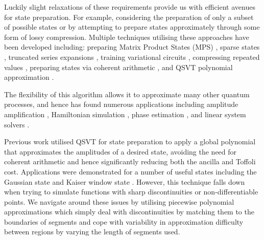 Luckily slight relaxations of these requirements provide us with efficient avenues for state preparation. For example, considering the preparation of only a subset of possible states or by attempting to prepare states approximately through some form of lossy compression. Multiple techniques utilising these approaches have been developed including: preparing Matrix Product States (MPS) \cite{Ran_2020, 9259933, Melnikov_2023, PhysRevA.101.010301, PhysRevResearch.4.043007, Iaconis:2023rna, PhysRevLett.132.040404}, sparse states \cite{Zhang2022}, truncated series expansions \cite{Welch_2014, Zylberman:2023knk, Moosa:2023ecz}, training variational circuits \cite{Zoufal_2019, Nakaji:2021dew, Marin-Sanchez:2021ast}, compressing repeated values \cite{Sunderhauf:2023xrz, PhysRevResearch.5.013200}, preparing states via coherent arithmetic \cite{Bhaskar:2015jjo, Haner:2018yea}, and QSVT polynomial approximation \cite{mcardleQuantumStatePreparation2022, Gonzalez-Conde:2023fjg}. 

 The flexibility of this algorithm allows it to approximate many other quantum processes, and hence has found numerous applications including amplitude amplification  \cite{Gilyen:2018khw}, Hamiltonian simulation  \cite{Gilyen:2018khw}, phase estimation \cite{Martyn:2021eaf}, and linear system solvers \cite{Gilyen:2018khw}. 

Previous work utilised QSVT for state preparation to apply a global polynomial that approximates the amplitudes of a desired state, avoiding the need for coherent arithmetic and hence significantly reducing both the ancilla and Toffoli cost. Applications were demonstrated for a number of useful states including the Gaussian state and Kaiser window state \cite{mcardleQuantumStatePreparation2022}. However, this technique falls down when trying to simulate functions with sharp discontinuities or non-differentiable points. We navigate around these issues by utilising piecewise polynomial approximations which simply deal with discontinuities by matching them to the boundaries of segments and cope with variability in approximation difficulty between regions by varying the length of segments used.    

